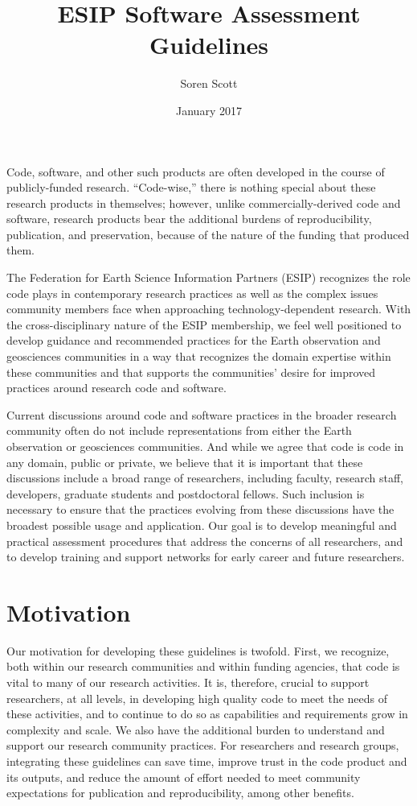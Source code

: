 \documentclass{article}
\title{ESIP Software Assessment Guidelines}
\author{Soren Scott}
\date{January 2017}
\begin{document}
\maketitle
\newpage
\tableofcontents
\newpage

Code, software, and other such products are often developed in the course of publicly-funded research. “Code-wise,” there is nothing special about these research products in themselves; however, unlike commercially-derived code and software, research products bear the additional burdens of reproducibility, publication, and preservation, because of the nature of the funding that produced them.

The Federation for Earth Science Information Partners (ESIP) recognizes the role code plays in contemporary research practices as well as the complex issues community members face when approaching technology-dependent research. With the cross-disciplinary nature of the ESIP membership, we feel well positioned to develop guidance and recommended practices for the Earth observation and geosciences communities in a way that recognizes the domain expertise within these communities and that supports the communities’ desire for improved practices around research code and software.

Current discussions around code and software practices in the broader research community often do not include representations from either the Earth observation or geosciences communities. And while we agree that code is code in any domain, public or private, we believe that it is important that these discussions include a broad range of researchers, including faculty, research staff, developers, graduate students and postdoctoral fellows. Such inclusion is necessary to ensure that the practices evolving from these discussions have the broadest possible usage and application. Our goal is to develop meaningful and practical assessment procedures that address the concerns of all researchers, and to develop training and support networks for early career and future researchers.

\section{Motivation}
Our motivation for developing these guidelines is twofold. First, we recognize, both within our research communities and within funding agencies, that code is vital to many of our research activities. It is, therefore, crucial to support researchers, at all levels, in developing high quality code to meet the needs of these activities, and to continue to do so as capabilities and requirements grow in complexity and scale. We also have the additional burden to understand and support our research community practices. For researchers and research groups, integrating these guidelines can save time, improve trust in the code product and its outputs, and reduce the amount of effort needed to meet community expectations for publication and reproducibility, among other benefits. 
 
\end{document}
